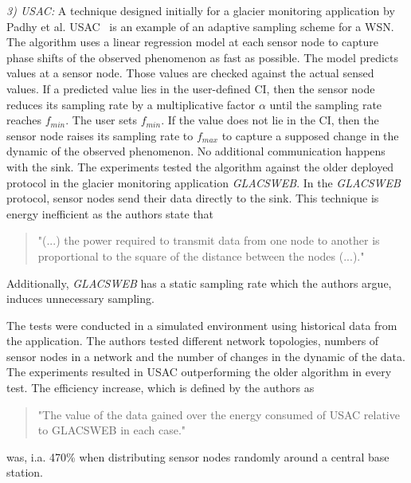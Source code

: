 \textit{3) \ac{USAC}:}
A technique designed initially for a glacier monitoring application by Padhy et
al. \ac{USAC}~\cite{padhy2006utility} is an example of an adaptive sampling
scheme for a \ac{WSN}. The algorithm uses a linear regression model at each
sensor node to capture phase shifts of the observed phenomenon as fast as
possible. The model predicts values at a sensor node. Those values are checked
against the actual sensed values. If a predicted value lies in the user-defined
\ac{CI}, then the sensor node reduces its sampling rate by a multiplicative
factor $ \alpha $ until the sampling rate reaches $ f_{min} $. The user sets $
f_{min} $. If the value does not lie in the \ac{CI}, then the sensor node
raises its sampling rate to $ f_{max} $ to capture a supposed change in the
dynamic of the observed phenomenon. No additional communication happens with
the sink. The experiments tested the algorithm against the older deployed
protocol in the glacier monitoring application \textit{GLACSWEB}. In the
\textit{GLACSWEB} protocol, sensor nodes send their data directly to the sink.
This technique is energy inefficient as the authors state that
\begin{quotation} "(...) the power required to transmit data from one node to
another is proportional to the square of the distance between the nodes (...)."
\end{quotation}

Additionally, \textit{GLACSWEB} has a static sampling rate which the authors
argue, induces unnecessary sampling.

The tests were conducted in a simulated environment using historical data from
the application. The authors tested different network topologies, numbers of
sensor nodes in a network and the number of changes in the dynamic of the data.
The experiments resulted in \ac{USAC} outperforming the older algorithm in
every test. The efficiency increase, which is defined by the authors as

\begin{quotation}
    "The value of the data gained over the energy consumed of USAC relative to
    GLACSWEB in each case."
\end{quotation}


was, i.a. 470\% when distributing sensor nodes randomly around a central base
station.
\par


